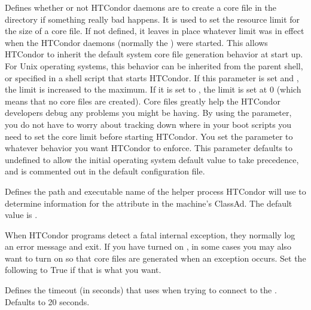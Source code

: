 \begin{description}
\label{param:CreateCoreFiles}
\item[\Macro{CREATE\_CORE\_FILES}]
  Defines whether or not HTCondor daemons are to
  create a core file in the  directory
  if something really bad happens.  It is
  used to set
  the resource limit for the size of a core file.  If not defined,
  it leaves in place whatever limit was in effect
  when the HTCondor daemons (normally the ) were started.
  This allows HTCondor to inherit the default system core file generation
  behavior at start up.  For Unix operating systems, this behavior can
  be inherited from the parent shell, or specified in a shell script
  that starts HTCondor.
  If this parameter is set and , the limit is increased to
  the maximum.  If it is set to , the limit is set at 0
  (which means that no core files are created).  Core files
  greatly help the HTCondor developers debug any problems you might be
  having.  By using the parameter, you do not have to worry about
  tracking down where in your boot scripts you need to set the core
  limit before starting HTCondor. You set the parameter
  to whatever behavior you want HTCondor to enforce.  This parameter
  defaults to undefined to allow the initial operating system default
  value to take precedence, 
  and is commented out in the default configuration file. 

\label{param:CkptProbe}
\item[\Macro{CKPT\_PROBE}]
  Defines the path and executable name of the helper process HTCondor will use to
  determine information for the  attribute
  in the machine's ClassAd. 
  The default value is .

\label{param:AbortOnException}
\item[\Macro{ABORT\_ON\_EXCEPTION}]
  When HTCondor programs detect a fatal internal exception, they
  normally log an error message and exit.  If you have turned on
  , in some cases you may also want to turn
  on  so that core files are generated
  when an exception occurs.  Set the following to True if that is what
  you want.

\label{param:QQueryTimeout}
\item[\Macro{Q\_QUERY\_TIMEOUT}]
  Defines the timeout (in seconds) that  uses when trying to
  connect to the .  Defaults to 20 seconds.


\end{description}
